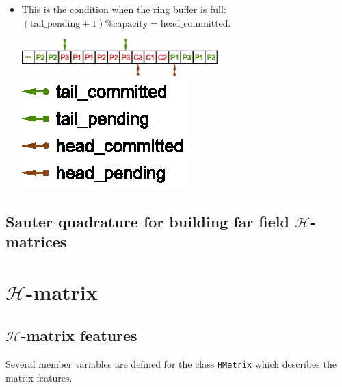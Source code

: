 \documentclass[11pt, a4paper]{book}
\begin{document}
\begin{itemize}
\begin{center}
  \end{center}
\item This is the condition when the ring buffer is full:
  $(\text{tail\_pending} + 1) \% \text{capacity} = \text{head\_committed}$.
  \begin{center}
    \includegraphics[width=0.6\textwidth,
    keepaspectratio]{figures/2023-05-10-ring-buffer-full}
    \includegraphics{figures/2023-05-10-ring-buffer-pointer-symbols}
  \end{center}
\end{itemize}

\section{Sauter quadrature for building far field $\mathcal{H}$-matrices}

\chapter{$\mathcal{H}$-matrix}

\section{$\mathcal{H}$-matrix features}

Several member variables are defined for the class \texttt{HMatrix} which describes the
matrix features.
\end{document}
